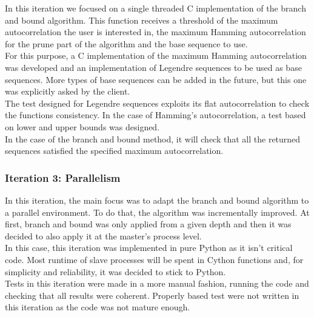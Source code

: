       In this iteration we focused on a single threaded C implementation of the
      branch and bound algorithm. This function receives a threshold of the
      maximum autocorrelation the user is interested in, the maximum Hamming
      autocorrelation for the prune part of the algorithm and the base sequence
      to use.\\

      For this purpose, a C implementation of the maximum Hamming
      autocorrelation was developed and an implementation of Legendre sequences
      to be used as base sequences. More types of base sequences can be added
      in the future, but this one was explicitly asked by the client.\\

      The test designed for Legendre sequences exploits its flat
      autocorrelation to check the functions consistency. In the case of
      Hamming's autocorrelation, a test based on lower and upper
      bounds was designed.\\

      In the case of the branch and bound method, it will check that all the
      returned sequences satisfied the specified maximum autocorrelation.\\

      \subsubsection{Iteration 3: Parallelism}

      In this iteration, the main focus was to adapt the branch and bound algorithm
      to a parallel environment. To do that, the algorithm was incrementally
      improved. At first, branch and bound was only applied from a given depth and
      then it was decided to also apply it at the master's process level.\\

      In this case, this iteration was implemented in pure Python as it isn't
      critical code. Most runtime of slave processes will be spent in Cython
      functions and, for simplicity and reliability, it was decided to stick to
      Python.\\

      Tests in this iteration were made in a more manual fashion, running the
      code and checking that all results were coherent. Properly based test were not written in this iteration as the code was not mature enough.\\
      
